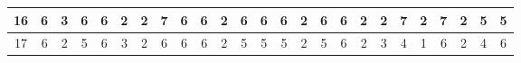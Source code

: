\begin{sidewaystable}[]
\begin{tabular}{|c|c|c|c|c|c|c|c|c|c|c|c|c|c|c|c|c|c|c|c|c|c|c|c|c|}
    16      & 6                                               & 3                                               & 6                                               & 6                                               & 2                                               & 2                                               & 7                                               & 6                                               & 6                                               & 2                                                & 6                                                & 6                                                & 6                                               & 2                                               & 6                                               & 6                                               & 2                                               & 2                                               & 7                                               & 2                                                 & 7                                               & 2                                                & 5                                                & 5                                                \\ \hline
    17      & 6                                               & 2                                               & 5                                               & 6                                               & 3                                               & 2                                               & 6                                               & 6                                               & 6                                               & 2                                                & 5                                                & 5                                                & 5                                               & 2                                               & 5                                               & 6                                               & 2                                               & 3                                               & 4                                               & 1                                                 & 6                                               & 2                                                & 4                                                & 6                                                \\ \hline

\end{tabular}
\end{sidewaystable}
